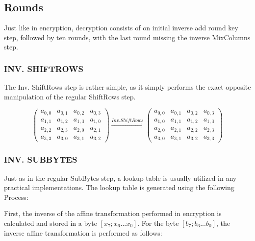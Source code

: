 \documentclass[12pt]{report}
\theoremstyle{definition}
\theoremstyle{remark}
\begin{document}
\subsection{Rounds}
Just like in encryption, decryption consists of on initial inverse add round key step, followed by ten rounds, with the last round missing the inverse MixColumns step.

\subsubsection{INV. SHIFTROWS}
The Inv. ShiftRows step is rather simple, as it simply performs the exact opposite manipulation of the regular ShiftRows step.

\[
\left( \begin{array}{cccc}
a_{0,0} & a_{0,1} & a_{0,2} & a_{0,3} \\
a_{1,1} & a_{1,2} & a_{1,3} & a_{1,0} \\
a_{2,2} & a_{2,3} & a_{2,0} & a_{2,1} \\
a_{3,3} & a_{3,0} & a_{3,1} & a_{3,2}\end{array} \right)
\xrightarrow{Inv. ShiftRows}
\left( \begin{array}{cccc}
a_{0,0} & a_{0,1} & a_{0,2} & a_{0,3} \\
a_{1,0} & a_{1,1} & a_{1,2} & a_{1,3} \\
a_{2,0} & a_{2,1} & a_{2,2} & a_{2,3} \\
a_{3,0} & a_{3,1} & a_{3,2} & a_{3,3}\end{array} \right)
\]

\subsubsection{INV. SUBBYTES}
Just as in the regular SubBytes step, a lookup table is usually utilized in any practical implementations. The lookup table is generated using the following Process:

First, the inverse of the affine transformation performed in encryption is calculated and stored in a byte $[x_7;x_6...x_0]$. For the byte $[b_7;b_6...b_0]$, the inverse affine transformation is performed as follows:
\end{document}
